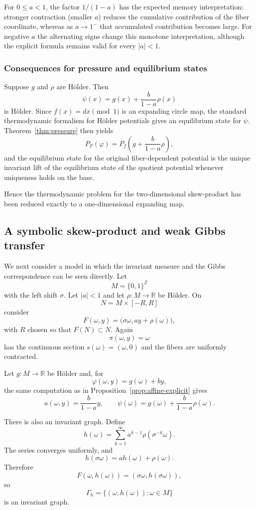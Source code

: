\documentclass[11pt,a4paper]{article}
\begin{document}
For $0\le a<1$, the factor $1/(1-a)$ has the expected memory
interpretation: stronger contraction (smaller $a$) reduces the cumulative
contribution of the fiber coordinate, whereas as $a\to1^-$ that accumulated
contribution becomes large. For negative $a$ the alternating signs change
this monotone interpretation, although the explicit formula remains valid
for every $|a|<1$.

\subsubsection{Consequences for pressure and equilibrium states}

Suppose $g$ and $\rho$ are H\"older. Then
\[
\psi(x)=g(x)+\frac{b}{1-a}\rho(x)
\]
is H\"older. Since $f(x)=dx\pmod1$ is an expanding circle map, the standard
thermodynamic formalism for H\"older potentials gives an equilibrium state
for $\psi$. Theorem~\ref{thm:pressure} then yields
\[
P_F(\varphi)
=
P_f\!\left(g+\frac{b}{1-a}\rho\right),
\]
and the equilibrium state for the original fiber-dependent potential is the
unique invariant lift of the equilibrium state of the quotient potential
whenever uniqueness holds on the base.

Hence the thermodynamic problem for the two-dimensional skew-product has
been reduced exactly to a one-dimensional expanding map.

\subsection{A symbolic skew-product and weak Gibbs transfer}

We next consider a model in which the invariant measure and the Gibbs
correspondence can be seen directly. Let
\[
M=\{0,1\}^{\mathbb Z}
\]
with the left shift $\sigma$. Let $|a|<1$ and let
$\rho:M\to\mathbb R$ be H\"older. On
\[
N=M\times[-R,R]
\]
consider
\[
F(\omega,y)=\bigl(\sigma\omega,ay+\rho(\omega)\bigr),
\]
with $R$ chosen so that $F(N)\subset N$. Again
\[
\pi(\omega,y)=\omega
\]
has the continuous section $s(\omega)=(\omega,0)$ and the fibers are
uniformly contracted.

Let $g:M\to\mathbb R$ be H\"older and, for
\[
\varphi(\omega,y)=g(\omega)+by,
\]
the same computation as in Proposition~\ref{prop:affine-explicit} gives
\[
u(\omega,y)=\frac{b}{1-a}y,
\qquad
\psi(\omega)=g(\omega)+\frac{b}{1-a}\rho(\omega).
\]

There is also an invariant graph. Define
\[
h(\omega)
=
\sum_{k=1}^{\infty}a^{k-1}\rho(\sigma^{-k}\omega).
\]
The series converges uniformly, and
\[
h(\sigma\omega)=ah(\omega)+\rho(\omega).
\]
Therefore
\[
F(\omega,h(\omega))
=
(\sigma\omega,h(\sigma\omega)),
\]
so
\[
\Gamma_h=\{(\omega,h(\omega)):\omega\in M\}
\]
is an invariant graph.
\end{document}
